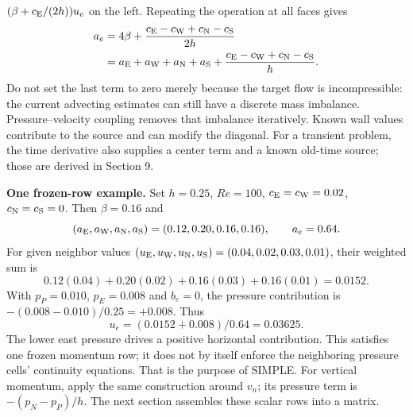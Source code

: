 $(\beta+c_{\rm E}/(2h))u_e$ on the left. Repeating the operation at all faces gives
\begin{align*}
a_e&=4\beta+\frac{c_{\rm E}-c_{\rm W}+c_{\rm N}-c_{\rm S}}{2h}\\
&=a_{\rm E}+a_{\rm W}+a_{\rm N}+a_{\rm S}
+\frac{c_{\rm E}-c_{\rm W}+c_{\rm N}-c_{\rm S}}{h}.
\end{align*}
Do not set the last term to zero merely because the target flow is
incompressible: the current advecting estimates can still have a discrete mass
imbalance. Pressure--velocity coupling removes that imbalance iteratively.
Known wall values contribute to the source and can modify the diagonal.
For a transient problem, the time derivative also supplies a center term and
a known old-time source; those are derived in Section 9.

\textbf{One frozen-row example.} Set $h=0.25$, $Re=100$,
$c_{\rm E}=c_{\rm W}=0.02$, $c_{\rm N}=c_{\rm S}=0$.
Then $\beta=0.16$ and
\[
(a_{\rm E},a_{\rm W},a_{\rm N},a_{\rm S})=(0.12,0.20,0.16,0.16),
\qquad a_e=0.64.
\]
For given neighbor values $(u_{\rm E},u_{\rm W},u_{\rm N},u_{\rm S})
=(0.04,0.02,0.03,0.01)$, their weighted sum is
\[
0.12(0.04)+0.20(0.02)+0.16(0.03)+0.16(0.01)=0.0152.
\]
With $p_P=0.010$, $p_E=0.008$ and $b_e=0$, the pressure contribution is
$-(0.008-0.010)/0.25=+0.008$. Thus
\[
\boxed{u_e=(0.0152+0.008)/0.64=0.03625.}
\]
The lower east pressure drives a positive horizontal contribution.
This satisfies one frozen momentum row; it does not by itself enforce the
neighboring pressure cells' continuity equations. That is the purpose of SIMPLE.
For vertical momentum, apply the same construction around $v_n$; its pressure
term is $-(p_N-p_P)/h$. The next section assembles these scalar rows into a matrix.

